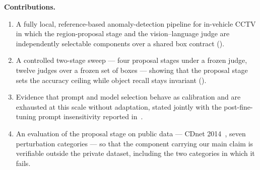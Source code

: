 \medskip
\noindent\textbf{Contributions.}
\begin{enumerate}
  \item A fully local, reference-based anomaly-detection pipeline for
        in-vehicle CCTV in which the region-proposal stage and the
        vision--language judge are independently selectable components over a
        shared box contract ().
  \item A controlled two-stage sweep --- four proposal stages under a frozen
        judge, twelve judges over a frozen set of boxes --- showing that the
        proposal stage sets the accuracy ceiling while object recall stays
        invariant ().
  \item Evidence that prompt and model selection behave as calibration and are
        exhausted at this scale without adaptation, stated jointly with the
        post-fine-tuning prompt insensitivity reported
        in~\cite{Borodin_2025}.
  \item An evaluation of the proposal stage on public data --- CDnet
        2014~\cite{Wang_2014}, seven perturbation categories --- so that the
        component carrying our main claim is verifiable outside the private
        dataset, including the two categories in which it fails.
\end{enumerate}
